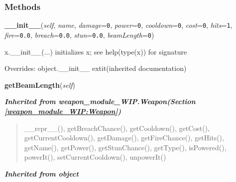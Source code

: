   \subsubsection{Methods}

    \vspace{0.5ex}

\hspace{.8\funcindent}\begin{boxedminipage}{\funcwidth}

    \raggedright \textbf{\_\_init\_\_}(\textit{self}, \textit{name}, \textit{damage}={\tt 0}, \textit{power}={\tt 0}, \textit{cooldown}={\tt 0}, \textit{cost}={\tt 0}, \textit{hits}={\tt 1}, \textit{fire}={\tt 0.0}, \textit{breach}={\tt 0.0}, \textit{stun}={\tt 0.0}, \textit{beamLength}={\tt 0})

\setlength{\parskip}{2ex}
    x.\_\_init\_\_(...) initializes x; see help(type(x)) for signature

\setlength{\parskip}{1ex}
      Overrides: object.\_\_init\_\_ 	extit{(inherited documentation)}

    \end{boxedminipage}

    \label{weapon_module_WIP:Beam:getBeamLength}

    \vspace{0.5ex}

\hspace{.8\funcindent}\begin{boxedminipage}{\funcwidth}

    \raggedright \textbf{getBeamLength}(\textit{self})

\setlength{\parskip}{2ex}
\setlength{\parskip}{1ex}
    \end{boxedminipage}


\large{\textbf{\textit{Inherited from weapon\_module\_WIP.Weapon\textit{(Section \ref{weapon_module_WIP:Weapon})}}}}

\begin{quote}
\_\_repr\_\_(), getBreachChance(), getCooldown(), getCost(), getCurrentCooldown(), getDamage(), getFireChance(), getHits(), getName(), getPower(), getStunChance(), getType(), isPowered(), powerIt(), setCurrentCooldown(), unpowerIt()
\end{quote}

\large{\textbf{\textit{Inherited from object}}}

